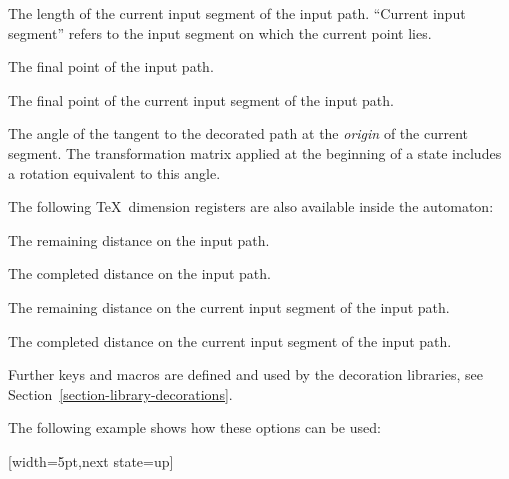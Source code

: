 \begin{command}{\pgfdeclaredecoration{}}
\begin{command}{\state{}}
    \begin{command}{\pgfdecoratedinputsegmentlength}
      The length of the current input segment of the input path. ``Current
      input segment''  refers to the input segment on which the current point
      lies.
    \end{command}
		
    \begin{command}{\pgfpointdecoratedpathlast}
      The final point of the input path.
    \end{command}

    \begin{command}{\pgfpointdecoratedinputsegmentlast}
      The final point of the current input segment of the input path.
    \end{command}
		
    \begin{command}{\pgfdecoratedangle}
      The angle of the tangent to the decorated path at the \emph{origin}
      of the current segment. The transformation matrix applied at
      the beginning of a state includes a rotation equivalent to
      this angle.
    \end{command}
		
    The following \TeX\ dimension registers are also available inside the
    automaton:

    \begin{command}{\pgfdecoratedremainingdistance}
      The remaining distance on the input path.
    \end{command}
		
    \begin{command}{\pgfdecoratedcompleteddistance}
      The completed distance on the input path.
    \end{command}

    \begin{command}{\pgfdecoratedinputsegmentremainingdistance}
      The remaining distance on the current input segment of the input path.
    \end{command}

    \begin{command}{\pgfdecoratedinputsegmentcompleteddistance}
      The completed distance on the current input segment of the input path.
    \end{command}

    Further keys and macros are defined and used by the decoration
    libraries, see Section~\ref{section-library-decorations}.

    The following example shows how these options can be used:
\begin{codeexample}[]
{
  [width=5pt,next state=up]
  { \pgfpathlineto{\pgfpoint{5pt}{0pt}} }

}
\end{codeexample}
\end{command}
\end{command}
